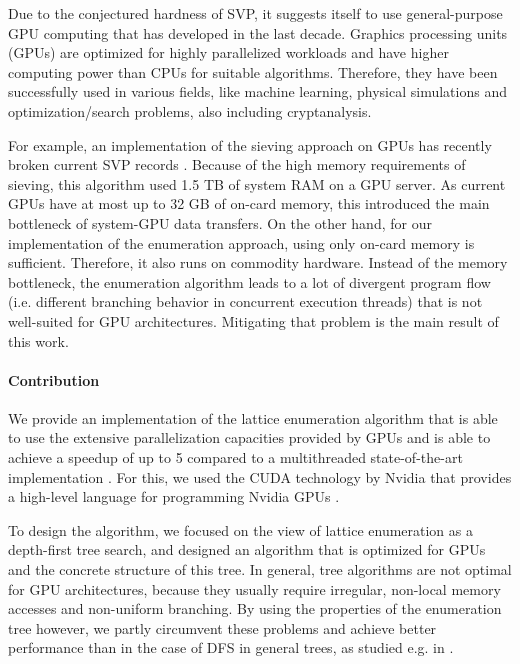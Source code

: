 \documentclass{scrartcl}
\begin{document}
    Due to the conjectured hardness of SVP, it suggests itself to use general-purpose GPU computing that has developed in the last decade.
    Graphics processing units (GPUs) are optimized for highly parallelized workloads and have higher computing power than CPUs for suitable algorithms.
    Therefore, they have been successfully used in various fields, like machine learning, physical simulations and optimization/search problems, also including cryptanalysis.
    
    For example, an implementation of the sieving approach on GPUs has recently broken current SVP records \cite{sieving_gpu}.
    Because of the high memory requirements of sieving, this algorithm used 1.5 TB of system RAM on a GPU server. As current GPUs have at most up to 32 GB of on-card memory, this introduced the main bottleneck of system-GPU data transfers.
    On the other hand, for our implementation of the enumeration approach, using only on-card memory is sufficient. Therefore, it also runs on commodity hardware.
    Instead of the memory bottleneck, the enumeration algorithm leads to a lot of divergent program flow (i.e. different branching behavior in concurrent execution threads) that is not well-suited for GPU architectures.
    Mitigating that problem is the main result of this work.

    \paragraph{Contribution}
    We provide an implementation of the lattice enumeration algorithm that is able to use the extensive parallelization capacities provided by GPUs and is able to achieve a speedup of up to 5 compared to a multithreaded state-of-the-art implementation \cite{fplll}.
    For this, we used the CUDA technology by Nvidia that provides a high-level language for programming Nvidia GPUs \cite{cuda}.
    
    To design the algorithm, we focused on the view of lattice enumeration as a depth-first tree search, and designed an algorithm that is optimized for GPUs and the concrete structure of this tree. 
    In general, tree algorithms are not optimal for GPU architectures, because they usually require irregular, non-local memory accesses and non-uniform branching.
    By using the properties of the enumeration tree however, we partly circumvent these problems and achieve better performance than in the case of DFS in general trees, as studied e.g. in \cite{tree_search_cuda}.
\end{document}
